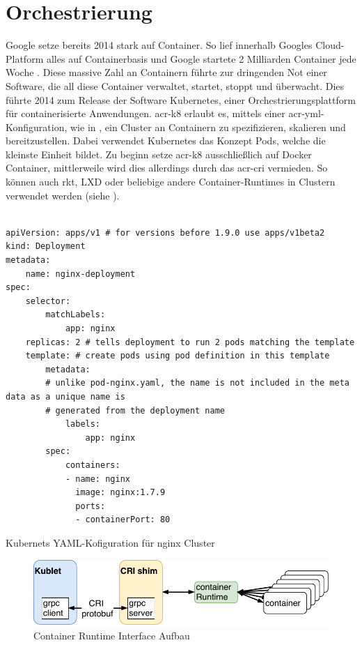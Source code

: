 \section{Orchestrierung}
\label{sec:aktuellesOrchestrierung}

Google setze bereits 2014 stark auf Container. So lief innerhalb Googles Cloud-Platform alles auf Containerbasis und Google startete 2 Milliarden Container jede Woche \citep{ContainersatScale}. Diese massive Zahl an Containern führte zur dringenden Not einer Software, die all diese Container verwaltet, startet, stoppt und überwacht. Dies führte 2014 zum Release der Software Kubernetes, einer Orchestrierungsplattform für containerisierte Anwendungen. \gls{acr-k8} erlaubt es, mittels einer \gls{acr-yml}-Konfiguration, wie in , ein Cluster an Containern zu spezifizieren, skalieren und bereitzustellen. Dabei verwendet Kubernetes das Konzept Pods, welche die kleinste Einheit bildet. Zu beginn setze \gls{acr-k8} ausschließlich auf Docker Container, mittlerweile wird dies allerdings durch das \gls{acr-cri} vermieden. So können auch rkt, LXD oder beliebige andere Container-Runtimes in Clustern verwendet werden (siehe ).

\begin{listing}[hp]
	\begin{verbatim}

apiVersion: apps/v1 # for versions before 1.9.0 use apps/v1beta2
kind: Deployment
metadata:
    name: nginx-deployment
spec:
    selector:
        matchLabels:
            app: nginx
    replicas: 2 # tells deployment to run 2 pods matching the template
    template: # create pods using pod definition in this template
        metadata:
        # unlike pod-nginx.yaml, the name is not included in the meta data as a unique name is
        # generated from the deployment name
            labels:
                app: nginx
        spec:
            containers:
            - name: nginx
              image: nginx:1.7.9
              ports:
              - containerPort: 80
	\end{verbatim}
	\caption{Kubernets YAML-Kofiguration für nginx Cluster \citep{KubernetesDocumentation}}
	\label{lst:k8yaml}
\end{listing}

\begin{figure}[h]
	\includegraphics[scale=1]{bilder/cri.pdf}
	\caption{Container Runtime Interface Aufbau \citep{KubernetesDocumentation}}
	\label{fig:k8cri}
\end{figure}

